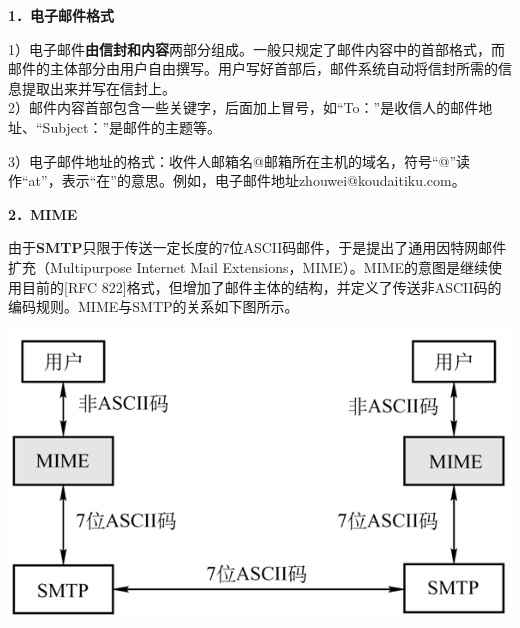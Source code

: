 \textbf{{1．电子邮件格式}}

1）电子邮件{\textbf{由信封和内容}}两部分组成。一般只规定了邮件内容中的首部格式，而邮件的主体部分由用户自由撰写。用户写好首部后，邮件系统自动将信封所需的信息提取出来并写在信封上。\\

2）邮件内容首部包含一些关键字，后面加上冒号，如``To：''是收信人的邮件地址、``Subject：''是邮件的主题等。

3）电子邮件地址的格式：收件人邮箱名@邮箱所在主机的域名，符号``@''读作``at''，表示``在''的意思。例如，电子邮件地址zhouwei@koudaitiku.com。

\textbf{{2．MIME}}

由于\textbf{SMTP}只限于传送一定长度的7位ASCII码邮件，于是提出了通用因特网邮件扩充（Multipurpose
Internet Mail Extensions，MIME）。MIME的意图是继续使用目前的{[}RFC
822{]}格式，但增加了邮件主体的结构，并定义了传送非ASCII码的编码规则。MIME与SMTP的关系如下图所示。

\includegraphics[width=6in]{png-jpeg-pics/2E26762CC2097F8BF63CFE77B865092C.png}
